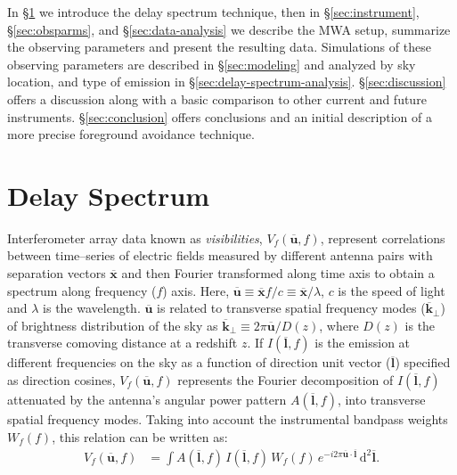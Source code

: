 \documentclass[preprint2,iop,numberedappendix]{emulateapj}
\newcommand{\dif}{\mathrm{d}}
\begin{document}
In \S\ref{sec:delay-spectrum} we introduce the delay spectrum technique, then in  \S\ref{sec:instrument}, \S\ref{sec:obsparms}, and \S\ref{sec:data-analysis} we describe the MWA setup, summarize the observing parameters and present the resulting data.  Simulations of these observing parameters are described in \S\ref{sec:modeling} and analyzed by sky location, and type of emission in \S\ref{sec:delay-spectrum-analysis}.  \S\ref{sec:discussion} offers a discussion along with a basic comparison to other current and future instruments. \S\ref{sec:conclusion} offers conclusions and an initial description of a more precise foreground avoidance technique.


\section{Delay Spectrum}\label{sec:delay-spectrum}

Interferometer array data known as {\it visibilities}, $V_f(\overline{\mathbf{u}},f)$, represent correlations between time--series of electric fields measured by different antenna pairs with separation vectors $\overline{\mathbf{x}}$ and then Fourier transformed along time axis to obtain a spectrum along frequency ($f$) axis. Here, $\overline{\mathbf{u}}\equiv \overline{\mathbf{x}}f/c \equiv \overline{\mathbf{x}}/\lambda$, $c$ is the speed of light and $\lambda$ is the wavelength. $\overline{\mathbf{u}}$ is related to transverse spatial frequency modes ($\overline{\mathbf{k}}_\perp$) of brightness distribution of the sky as $\overline{\mathbf{k}}_\perp \equiv 2\pi\overline{\mathbf{u}}/D(z)$, where $D(z)$ is the transverse comoving distance at a redshift $z$. If $I(\overline{\mathbf{l}},f)$ is the emission at different frequencies on the sky as a function of direction unit vector ($\overline{\mathbf{l}}$) specified as direction cosines, $V_f(\overline{\mathbf{u}},f)$ represents the Fourier decomposition of $I(\overline{\mathbf{l}},f)$ attenuated by the antenna's angular power pattern $A(\overline{\mathbf{l}},f)$, into transverse spatial frequency modes. Taking into account the instrumental bandpass weights $W_f(f)$, this relation can be written as:
\begin{align}\label{eqn:obsvis}
  V_f(\overline{\mathbf{u}},f) &= \int A(\overline{\mathbf{l}},f)\,I(\overline{\mathbf{l}},f)\,W_f(f)\,e^{-i2\pi \overline{\mathbf{u}}\cdot\overline{\mathbf{l}}}\,\dif^2 \overline{\mathbf{l}}.
\end{align}
\end{document}
